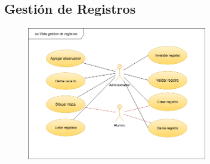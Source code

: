 		\subsection{Gestión de Registros}
			\begin{figure}[H]
			\centering
				\includegraphics[width=0.7\textwidth]{imagenes/DiagramasUML/gestionDeRegistros.png}
				\label{fig:casos-de-uso-tienda}
			\end{figure}
		
		\newpage

